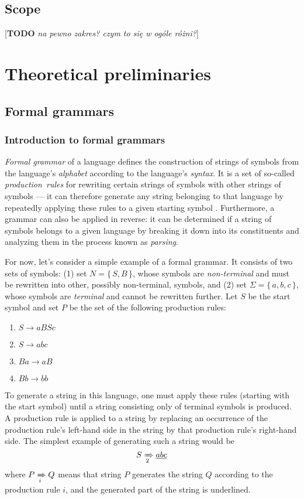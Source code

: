 \documentclass[english,engineering]{wizthesis}
\newcommand{\todo}[1]{{\color{red}[\textbf{TODO} \textit{#1}]}}
\begin{document}
\section{Scope}

\todo{na pewno zakres? czym to się w ogóle różni?}

\chapter{Theoretical preliminaries}

\section{Formal grammars}

\subsection{Introduction to formal grammars}

\textit{Formal grammar} of a language defines the construction of strings of
symbols from the language's \textit{alphabet} according to the language's
\textit{syntax}. It is a set of so-called \textit{production~rules} for
rewriting certain strings of symbols with other strings of symbols --- it can
therefore generate any string belonging to that language by repeatedly applying
these rules to a given starting symbol \cite{meduna-2014}. Furthermore, a
grammar can also be applied in reverse: it can be determined if a string of
symbols belongs to a given language by breaking it down into its constituents
and analyzing them in the process known as \textit{parsing}.

For now, let's consider a simple example of a formal grammar. It consists of two
sets of symbols: (1) set $N = \{\,S, B\,\}$, whose symbols are
\textit{non-terminal} and must be rewritten into other, possibly non-terminal,
symbols, and (2) set $\Sigma = \{\,a, b, c\,\}$, whose symbols are
\textit{terminal} and cannot be rewritten further. Let $S$ be the start symbol
and set $P$ be the set of the following production rules:
\begin{enumerate}[noitemsep]
  \item $S \rightarrow aBSc$
  \item $S \rightarrow abc$
  \item $Ba \rightarrow aB$
  \item $Bb \rightarrow bb$
\end{enumerate}
To generate a string in this language, one must apply these rules (starting with
the start symbol) until a string consisting only of terminal symbols is
produced. A production rule is applied to a string by replacing an occurrence
of the production rule's left-hand side in the string by that production rule's
right-hand side. The simplest example of generating such a string would be
\begin{equation*}
  S \xRightarrow[2]{} \underline{abc}
\end{equation*}
where $P \xRightarrow[i]{} Q$ means that string $P$ generates the string $Q$
according to the production rule $i$, and the generated part of the string
is underlined.
\end{document}
